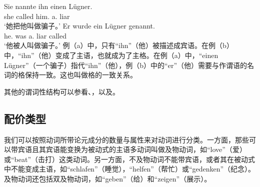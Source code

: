 \eal
\ex 
\gll Sie nannte ihn einen Lügner.\\
	 she called him.\acc{} a.\acc{} liar\\
\glt `她把他叫做骗子。'
\ex 
\gll Er wurde ein Lügner genannt.\\
	 he.\nom{} was a.\nom{} liar called\\
\glt `他被人叫做骗子。'
\zl
例（a）中，只有“ihn”（他）被描述成宾语。在例（b）中，“ihn”（他）变成了主语，也就成为了主格。在例（a）中，“einen Lügner”（一个骗子）指代“ihn”（他），例（b）中的“er”（他）需要与作谓语的名词的格保持一致。这也叫做格的一致关系。

其他的谓词性结构可以参看、，以及。


\subsection{配价类型}

\addlines
我们可以按照动词所带论元成分的数量与属性来对动词进行分类。一方面，那些可以带宾语且其宾语能变换为被动式的主语多动词叫做及物动词，如“love”（爱）或“beat”（击打）这类动词。另一方面，不及物动词不能带宾语，或者其在被动式中不能变成主语，如“schlafen”（睡觉），“helfen”（帮忙）或“gedenken”（纪念）。及物动词还包括双及物动词，如“geben”（给）和“zeigen”（展示）。

